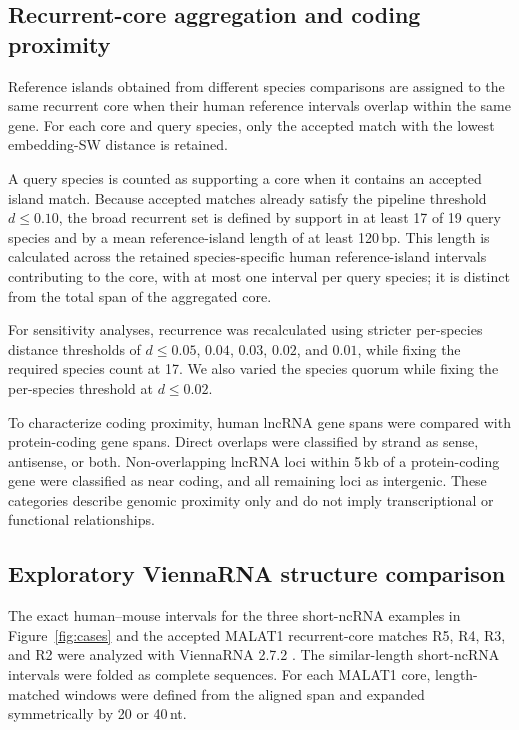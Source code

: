 \subsection{Recurrent-core aggregation and coding proximity}

Reference islands obtained from different species comparisons are assigned to the
same recurrent core when their human reference intervals overlap within the same
gene. For each core and query species, only the accepted match with the lowest
embedding-SW distance is retained.

A query species is counted as supporting a core when it contains an accepted
island match. Because accepted matches already satisfy the pipeline threshold
$d \leq 0.10$, the broad recurrent set is defined by support in at least 17 of
19 query species and by a mean reference-island length of at least 120\,bp. This
length is calculated across the retained species-specific human reference-island
intervals contributing to the core, with at most one interval per query species;
it is distinct from the total span of the aggregated core.

For sensitivity analyses, recurrence was recalculated using stricter
per-species distance thresholds of $d \leq 0.05$, $0.04$, $0.03$, $0.02$, and
$0.01$, while fixing the required species count at 17. We also varied the species
quorum while fixing the per-species threshold at $d \leq 0.02$.

To characterize coding proximity, human lncRNA gene spans were compared with
protein-coding gene spans. Direct overlaps were classified by strand as sense,
antisense, or both. Non-overlapping lncRNA loci within 5\,kb of a protein-coding
gene were classified as near coding, and all remaining loci as intergenic. These
categories describe genomic proximity only and do not imply transcriptional or
functional relationships.

\subsection{Exploratory ViennaRNA structure comparison}

The exact human--mouse intervals for the three short-ncRNA examples in
Figure~\ref{fig:cases} and the accepted MALAT1 recurrent-core matches R5, R4, R3,
and R2 were analyzed with ViennaRNA 2.7.2
\citep{lorenzViennaRNAPackage2011}. The similar-length short-ncRNA intervals were
folded as complete sequences. For each MALAT1 core, length-matched windows were
defined from the aligned span and expanded symmetrically by 20 or 40\,nt.

